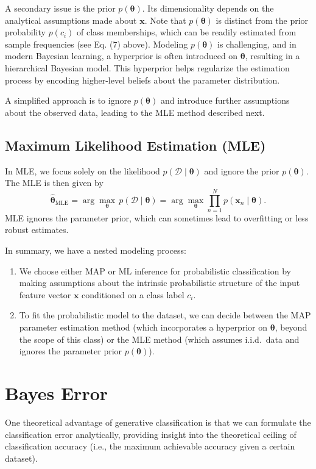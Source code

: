 \documentclass[12pt]{article}
\begin{document}
A secondary issue is the prior \(p(\pmb{\theta})\). Its dimensionality depends on the analytical assumptions made about \(\bm{x}\). Note that \(p(\pmb{\theta})\) is distinct from the prior probability \(p(c_i)\) of class memberships, which can be readily estimated from sample frequencies (see Eq. (7) above). Modeling \(p(\pmb{\theta})\) is challenging, and in modern Bayesian learning, a hyperprior is often introduced on \(\pmb{\theta}\), resulting in a hierarchical Bayesian model. This hyperprior helps regularize the estimation process by encoding higher-level beliefs about the parameter distribution.

A simplified approach is to ignore \(p(\pmb{\theta})\) and introduce further assumptions about the observed data, leading to the MLE method described next.

\subsection*{Maximum Likelihood Estimation (MLE)}

In MLE, we focus solely on the likelihood \(p(\mathcal{D} \mid \pmb{\theta})\) and ignore the prior \(p(\pmb{\theta})\). The MLE is then given by
\begin{equation}
\hat{\pmb{\theta}}_{\text{MLE}} = \arg\max_{\pmb{\theta}} \, p(\mathcal{D} \mid \pmb{\theta}) = \arg\max_{\pmb{\theta}} \prod_{n=1}^{N} p(\bm{x}_n \mid \pmb{\theta}).
\end{equation}
MLE ignores the parameter prior, which can sometimes lead to overfitting or less robust estimates.

In summary, we have a nested modeling process:
\begin{enumerate}
    \item We choose either MAP or ML inference for probabilistic classification by making assumptions about the intrinsic probabilistic structure of the input feature vector \(\bm{x}\) conditioned on a class label \(c_i\).
    \item To fit the probabilistic model to the dataset, we can decide between the MAP parameter estimation method (which incorporates a hyperprior on \(\pmb{\theta}\), beyond the scope of this class) or the MLE method (which assumes i.i.d.\ data and ignores the parameter prior \(p(\pmb{\theta})\)).
\end{enumerate}

\section{Bayes Error}
One theoretical advantage of generative classification is that we can formulate the classification error analytically, providing insight into the theoretical ceiling of classification accuracy (i.e., the maximum achievable accuracy given a certain dataset).
\end{document}
